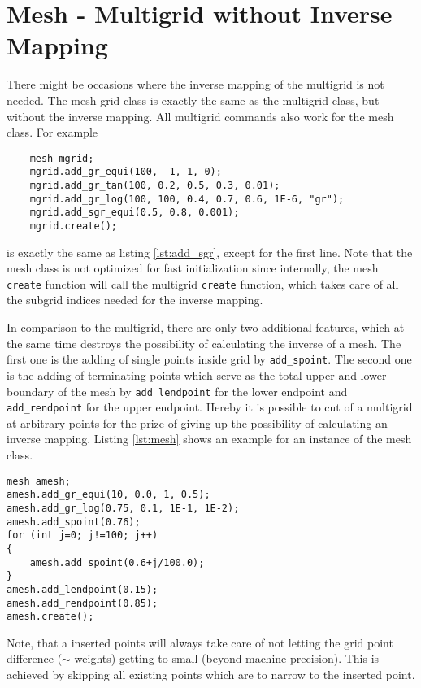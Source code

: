 \chapter{Mesh - Multigrid without Inverse Mapping}
There might be occasions where the inverse mapping of the multigrid is not needed. The mesh grid class is exactly the same as the multigrid class, but without the inverse mapping. All multigrid commands also work for the mesh class. For example 
\begin{lstlisting}
	mesh mgrid;
	mgrid.add_gr_equi(100, -1, 1, 0);
	mgrid.add_gr_tan(100, 0.2, 0.5, 0.3, 0.01);
	mgrid.add_gr_log(100, 100, 0.4, 0.7, 0.6, 1E-6, "gr");
	mgrid.add_sgr_equi(0.5, 0.8, 0.001);
	mgrid.create();
\end{lstlisting}
is exactly the same as listing \ref{lst:add_sgr}, except for the first line. Note that the mesh class is not optimized for fast initialization since internally, the mesh \texttt{create} function will call the multigrid \texttt{create} function, which takes care of all the subgrid indices needed for the inverse mapping.

In comparison to the multigrid, there are only two additional features, which at the same time destroys the possibility of calculating the inverse of a mesh. The first one is the adding of single points inside grid by
\texttt{add\_spoint}. The second one is the adding of terminating points which serve as the total upper and lower boundary of the mesh by \texttt{add\_lendpoint} for the lower endpoint and \texttt{add\_rendpoint} for the upper endpoint. Hereby it is possible to cut of a multigrid at arbitrary points for the prize of giving up the possibility of calculating an inverse mapping. Listing \ref{lst:mesh} shows an example for an instance of the mesh class.
\begin{lstlisting}[caption={Example of a mesh},label={lst:mesh}]
mesh amesh;
amesh.add_gr_equi(10, 0.0, 1, 0.5);
amesh.add_gr_log(0.75, 0.1, 1E-1, 1E-2);
amesh.add_spoint(0.76);
for (int j=0; j!=100; j++)
{
	amesh.add_spoint(0.6+j/100.0);
}
amesh.add_lendpoint(0.15);
amesh.add_rendpoint(0.85);
amesh.create();
\end{lstlisting}
Note, that a inserted points will always take care of not letting the grid point difference ($\sim$ weights) getting to small (beyond machine precision). This is achieved by skipping all existing points which are to narrow to the inserted point.